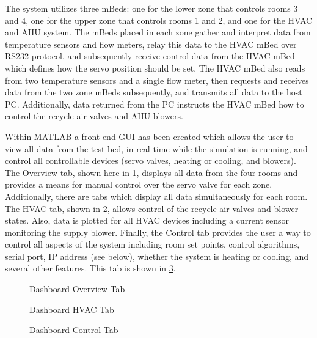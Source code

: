 \documentclass[a4paper,10pt,twocolumn]{article}
\begin{document}
The system utilizes three mBeds:  one for the lower zone that controls rooms 3 and 4, one for the upper zone that controls rooms 1 and 2, and one for the HVAC and AHU system.  The mBeds placed in each zone gather and interpret data from temperature sensors and flow meters, relay this data to the HVAC mBed over RS232 protocol, and subsequently receive control data from the HVAC mBed which defines how the servo position should be set.  The HVAC mBed also reads from two temperature sensors and a single flow meter, then requests and receives data from the two zone mBeds subsequently, and transmits all data to the host PC.  Additionally, data returned from the PC instructs the HVAC mBed how to control the recycle air valves and AHU blowers.

Within MATLAB a front-end GUI has been created which allows the user to view all data from the test-bed, in real time while the simulation is running, and control all controllable devices (servo valves, heating or cooling, and blowers).  The Overview tab, shown here in \ref{overview_tab}, displays all data from the four rooms and provides a means for manual control over the servo valve for each zone.  Additionally, there are tabs which display all data simultaneously for each room.  The HVAC tab, shown in \ref{HVAC_tab}, allows control of the recycle air valves and blower states.  Also, data is plotted for all HVAC devices including a current sensor monitoring the supply blower.  Finally, the Control tab provides the user a way to control all aspects of the system including room set points, control algorithms, serial port, IP address (see below), whether the system is heating or cooling, and several other features.  This tab is shown in \ref{control_tab}.  

\begin{figure}[t]
\centering
{}
\caption{Dashboard Overview Tab}
\label{overview_tab}
\end{figure}

\begin{figure}[b!]
\centering
{}
\caption{Dashboard HVAC Tab}
\label{HVAC_tab}
\end{figure}

\begin{figure}[t]
\centering
{}
\caption{Dashboard Control Tab}
\label{control_tab}
\end{figure}
\end{document}
